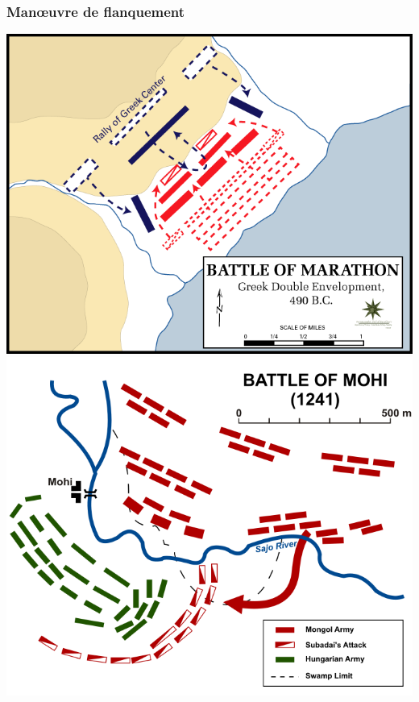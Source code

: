 \documentclass{article}
\begin{document}
\subsubsection{Manœuvre de flanquement}
\includegraphics[width=\linewidth]{../ressources/Battle_of_Marathon}
\includegraphics[width=\linewidth]{../ressources/Battle_of_Mohi}
\cite{tactic, flanking_maneuver, pincer_tactic}
\end{document}
